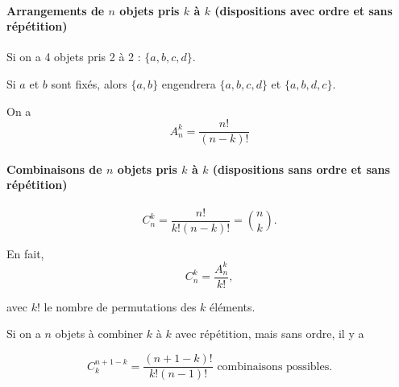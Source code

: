 \documentclass[french]{book}
\theoremstyle{definition}
\theoremstyle{remark}
\newtheorem{exo}{Exercice}
\begin{document}
\paragraph{Arrangements de $n$ objets pris $k$ à $k$ (dispositions avec ordre et sans répétition)} %

Si on a 4 objets pris 2 à 2 : $\{ a,b,c,d \} $.

Si $a$ et $b$ sont fixés, alors $\{ a,b \} $ engendrera $\{ a,b,c,d \} $ et $\{ a,b,d,c \} $.

On a $$A _{n} ^{k} = \frac{n!}{(n-k)!}$$

\paragraph{Combinaisons de $n$ objets pris $k$ à $k$ (dispositions sans ordre et sans répétition)}

\begin{equation}
  C _{n} ^{k} = \frac{n!}{k!(n-k)!} = \binom{n}{k}.
\end{equation}

En fait,
\begin{equation*}
  C _{n} ^{k} = \frac{A _{n} ^{k}}{k!},
\end{equation*}

avec $k!$ le nombre de permutations des $k$ éléments.



Si on a $n$ objets à combiner $k$ à $k$ avec répétition, mais sans ordre, il y a

\begin{equation}
  C _{k} ^{n+1-k} = \frac{(n+1-k)!}{k!(n-1)!} \text{ combinaisons possibles.}
\end{equation}


\end{document}
